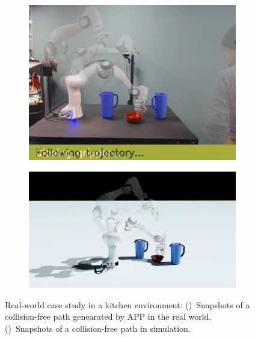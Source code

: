 \documentclass[a4paper]{report}
\begin{document}
\begin{figure}[t]
    \centering
    \begin{subfigure}{0.48\textwidth}
        \includegraphics[trim={0.5cm 1.5cm 3cm 0},clip, width=\textwidth]{path_real.png}
        \caption{}
        \label{fig:real}
    \end{subfigure} 
    \begin{subfigure}{0.48\textwidth}
        \includegraphics[trim={8cm 0.55cm 8cm 0.55cm},clip, width=\textwidth]{path_sim.png}
        \caption{}
        \label{fig:sim}
    \end{subfigure}
    \caption{
    Real-world case study in a kitchen environment: 
     ()~Snapshots of a collision-free path genearated by APP in the real world.
    ()~Snapshots of a collision-free path in simulation.
    }
\label{fig:real-world}
\end{figure}
\end{document}
